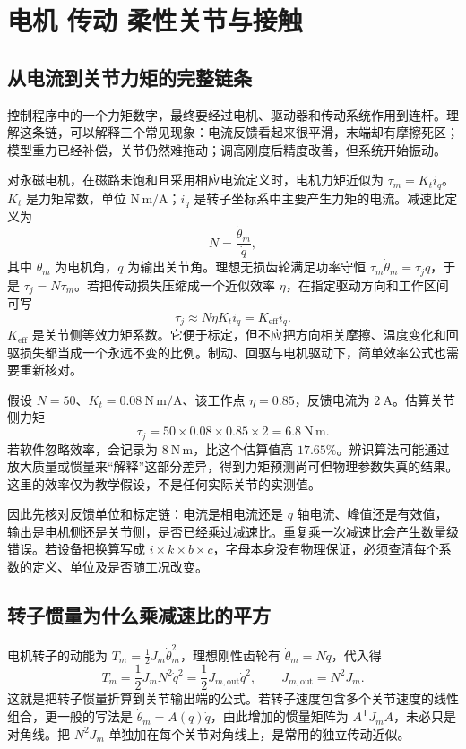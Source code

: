 \chapter{电机 传动 柔性关节与接触}\label{ch:actuation}
\section{从电流到关节力矩的完整链条}
控制程序中的一个力矩数字，最终要经过电机、驱动器和传动系统作用到连杆。理解这条链，可以解释三个常见现象：电流反馈看起来很平滑，末端却有摩擦死区；模型重力已经补偿，关节仍然难拖动；调高刚度后精度改善，但系统开始振动。

对永磁电机，在磁路未饱和且采用相应电流定义时，电机力矩近似为 $\tau_m=K_t i_q$。$K_t$ 是力矩常数，单位 $\mathrm{N\,m/A}$；$i_q$ 是转子坐标系中主要产生力矩的电流。减速比定义为
\[
 N=\frac{\dot\theta_m}{\dot q},
\]
其中 $\theta_m$ 为电机角，$q$ 为输出关节角。理想无损齿轮满足功率守恒 $\tau_m\dot\theta_m=\tau_j\dot q$，于是 $\tau_j=N\tau_m$。若把传动损失压缩成一个近似效率 $\eta$，在指定驱动方向和工作区间可写
\begin{equation}
 \tau_j\approx N\eta K_ti_q=K_{\mathrm{eff}}i_q.
\end{equation}
$K_{\mathrm{eff}}$ 是关节侧等效力矩系数。它便于标定，但不应把方向相关摩擦、温度变化和回驱损失都当成一个永远不变的比例。制动、回驱与电机驱动下，简单效率公式也需要重新核对。

\begin{examplebox}[算例 7A 电流换算与模型偏差]
假设 $N=50$、$K_t=0.08\ \mathrm{N\,m/A}$、该工作点 $\eta=0.85$，反馈电流为 $2\ \mathrm A$。估算关节侧力矩
\[
 \tau_j=50\times0.08\times0.85\times2=6.8\ \mathrm{N\,m}.
\]
若软件忽略效率，会记录为 $8\ \mathrm{N\,m}$，比这个估算值高 $17.65\%$。辨识算法可能通过放大质量或惯量来“解释”这部分差异，得到力矩预测尚可但物理参数失真的结果。这里的效率仅为教学假设，不是任何实际关节的实测值。
\end{examplebox}

因此先核对反馈单位和标定链：电流是相电流还是 $q$ 轴电流、峰值还是有效值，输出是电机侧还是关节侧，是否已经乘过减速比。重复乘一次减速比会产生数量级错误。若设备把换算写成 $i\times k\times b\times c$，字母本身没有物理保证，必须查清每个系数的定义、单位及是否随工况改变。

\section{转子惯量为什么乘减速比的平方}
电机转子的动能为 $T_m=\tfrac12J_m\dot\theta_m^2$，理想刚性齿轮有 $\dot\theta_m=N\dot q$，代入得
\[
 T_m=\frac12J_mN^2\dot q^2=\frac12J_{m,\mathrm{out}}\dot q^2,
 \qquad J_{m,\mathrm{out}}=N^2J_m.
\]
这就是把转子惯量折算到关节输出端的公式。若转子速度包含多个关节速度的线性组合，更一般的写法是 $\dot\theta_m=A(q)\dot q$，由此增加的惯量矩阵为 $A^{\mathsf T}J_mA$，未必只是对角线。把 $N^2J_m$ 单独加在每个关节对角线上，是常用的独立传动近似。

